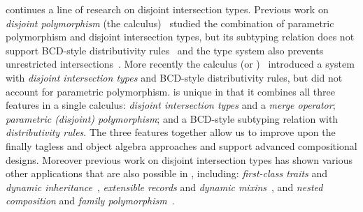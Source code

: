 \fnamee continues a line of
research on disjoint intersection types.
 Previous work on
\emph{disjoint polymorphism} (the \fname calculus)~\cite{alpuimdisjoint} studied the
combination of parametric polymorphism and disjoint intersection
types, but its subtyping relation does not support
BCD-style distributivity rules~\cite{Barendregt_1983} and the type system
also prevents unrestricted intersections~\cite{dunfield2014elaborating}. More recently the \name
calculus (or \namee)~\cite{bi_et_al:LIPIcs:2018:9227} introduced a system with \emph{disjoint
  intersection types} and BCD-style distributivity rules, but did not
account for parametric polymorphism. \fnamee is unique in that it
combines all three features in a single calculus:
\emph{disjoint intersection types} and a \emph{merge operator};
\emph{parametric (disjoint) polymorphism}; and a BCD-style subtyping
relation with \emph{distributivity rules}. The three features together
allow us to improve upon the finally tagless and object
algebra approaches and support advanced compositional designs.
Moreover previous work on disjoint intersection types has shown 
various other applications that are also possible in \fnamee, including: \emph{first-class
  traits} and \emph{dynamic inheritance}~\cite{bi_et_al:LIPIcs:2018:9214}, \emph{extensible records} and \emph{dynamic
  mixins}~\cite{alpuimdisjoint}, and \emph{nested composition} and \emph{family polymorphism}~\cite{bi_et_al:LIPIcs:2018:9227}. 


